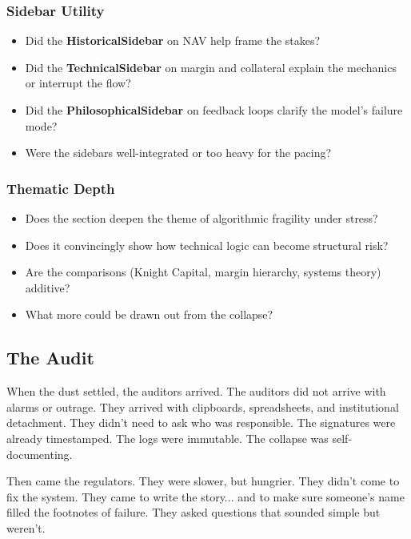 \subsubsection{Sidebar Utility}

\begin{itemize}
  \item Did the \textbf{HistoricalSidebar} on NAV help frame the stakes?
  \item Did the \textbf{TechnicalSidebar} on margin and collateral explain the mechanics or interrupt the flow?
  \item Did the \textbf{PhilosophicalSidebar} on feedback loops clarify the model's failure mode?
  \item Were the sidebars well-integrated or too heavy for the pacing?
\end{itemize}

\subsubsection{Thematic Depth}

\begin{itemize}
  \item Does the section deepen the theme of algorithmic fragility under stress?
  \item Does it convincingly show how technical logic can become structural risk?
  \item Are the comparisons (Knight Capital, margin hierarchy, systems theory) additive?
  \item What more could be drawn out from the collapse?
\end{itemize}



\subsection{The Audit}

When the dust settled, the auditors arrived.
The auditors did not arrive with alarms or outrage. They arrived with clipboards, spreadsheets, and institutional detachment.
They didn’t need to ask who was responsible. The signatures were already timestamped. The logs were immutable. 
The collapse was self-documenting.

Then came the regulators.
They were slower, but hungrier.
They didn’t come to fix the system. They came to write the story... and to make sure someone’s name filled 
the footnotes of failure. They asked questions that sounded simple but weren’t.

